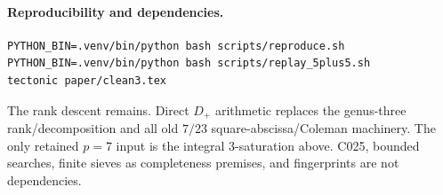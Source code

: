 \documentclass[11pt]{article}
\begin{document}
\begingroup\small
\paragraph{Reproducibility and dependencies.}
\begin{verbatim}
PYTHON_BIN=.venv/bin/python bash scripts/reproduce.sh
PYTHON_BIN=.venv/bin/python bash scripts/replay_5plus5.sh
tectonic paper/clean3.tex
\end{verbatim}
The rank descent remains.  Direct \(D_+\) arithmetic replaces the genus-three
rank/decomposition and all old \(7/23\) square-abscissa/Coleman machinery.
The only retained \(p=7\) input is the integral \(3\)-saturation above.
C025, bounded searches, finite sieves as completeness premises, and
fingerprints are not dependencies.
\endgroup
\end{document}
